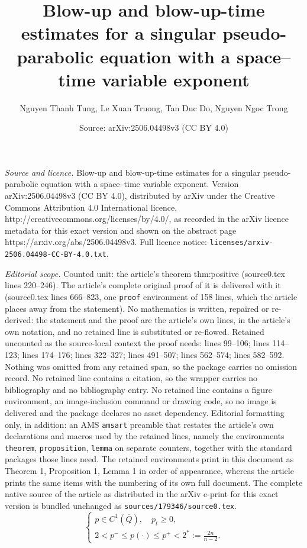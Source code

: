 \documentclass[10pt,a4paper]{amsart}
\title{Blow-up and blow-up-time estimates for a singular pseudo-parabolic equation with a space--time variable exponent}
\author{Nguyen Thanh Tung, Le Xuan Truong, Tan Duc Do, Nguyen Ngoc Trong}
\date{Source: arXiv:2506.04498v3 (CC BY 4.0)}
\begin{document}
\maketitle

\noindent\emph{Source and licence.} Blow-up and blow-up-time estimates for a singular pseudo-parabolic equation with a space--time variable exponent. Version arXiv:2506.04498v3 (CC BY 4.0), distributed by arXiv under the Creative Commons Attribution 4.0 International licence, http://creativecommons.org/licenses/by/4.0/, as recorded in the arXiv licence metadata for this exact version and shown on the abstract page https://arxiv.org/abs/2506.04498v3. Full licence notice: \texttt{licenses/arxiv-2506.04498-CC-BY-4.0.txt}.\par\smallskip

\noindent\textit{Editorial scope.} Counted unit: the article's theorem thm:positive (source0.tex lines 220--246). The article's complete original proof of it is delivered with it (source0.tex lines 666--823, one \texttt{proof} environment of 158 lines, which the article places away from the statement). No mathematics is written, repaired or re-derived: the statement and the proof are the article's own lines, in the article's own notation, and no retained line is substituted or re-flowed.  Retained uncounted as the source-local context the proof needs: lines 99--106; lines 114--123; lines 174--176; lines 322--327; lines 491--507; lines 562--574; lines 582--592.  Nothing was omitted from any retained span, so the package carries no omission record.  No retained line contains a citation, so the wrapper carries no bibliography and no bibliography entry.  No retained line contains a figure environment, an image-inclusion command or drawing code, so no image is delivered and the package declares no asset dependency.  Editorial formatting only, in addition: an AMS \texttt{amsart} preamble that restates the article's own declarations and macros used by the retained lines, namely the environments \texttt{theorem}, \texttt{proposition}, \texttt{lemma} on separate counters, together with the standard packages those lines need.  The retained environments print in this document as Theorem 1, Proposition 1, Lemma 1 in order of appearance, whereas the article prints the same items with the numbering of its own full document.  The complete native source of the article as distributed in the arXiv e-print for this exact version is bundled unchanged as \texttt{sources/179346/source0.tex}.
\begin{equation} \label{eq:p-assumption}
	\begin{cases}
		p \in C^1(\overline{Q}), \quad p_t \ge 0,
		\\[2mm]
		\displaystyle
		2 < p^- \le p(\cdot) \le p^+ < 2^*:=\frac{2n}{n-2}.
	\end{cases}
\end{equation}
\end{document}
